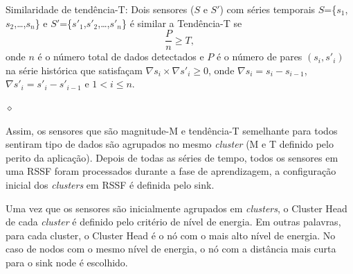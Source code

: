 \documentclass{acm_proc_article-sp}
\newcommand{\dia}{\hspace*{.1cm} \hfill $\diamond$}
\begin{document}
\begin{defini}

Similaridade de tendência-T: Dois sensores ($S$ e $S'$) com séries temporais
$S$=\{$s_{1}$,$s_{2}$,\ldots,$s_{n}$\} e
$S'$=\{$s'_{1}$,$s'_{2}$,\ldots,$s'_{n}$\} é similar a Tendência-T se
\begin{equation}
\label{equ:trend}
\frac{P}{n} \geq T,
\end{equation}
onde $n$ é o número total de dados detectados e $P$ é o número de pares
$(s_{i},s'_{i})$ na série histórica que satisfaçam $\nabla s_{i} \times \nabla
s'_{i} \geq 0$, onde $\nabla s_{i} = s_{i} - s_{i-1}$, $\nabla
s'_{i} = s'_{i} - s'_{i-1}$ e $1 < i \leq n$.

\dia
\end{defini}
\vspace*{-.5cm}

Assim, os sensores que são magnitude-M e tendência-T semelhante para
todos sentiram tipo de dados são agrupados no mesmo {\it cluster} (M e T definido
pelo perito da aplicação). Depois de todas as séries de tempo, todos os 
sensores em uma RSSF foram processados durante a fase de aprendizagem,
a configuração inicial dos {\it clusters} em RSSF é definida pelo sink.
\vspace*{-.3cm}

Uma vez que os sensores são inicialmente agrupados em {\it clusters},
o Cluster Head de cada {\it cluster} é definido pelo critério de nível de energia.
Em outras palavras, para cada cluster, o Cluster Head é o nó com o mais alto
nível de energia. No caso de nodos com o mesmo nível de energia, o nó com a
distância mais curta para o sink node é escolhido.
\vspace*{-.3cm}
\end{document}
